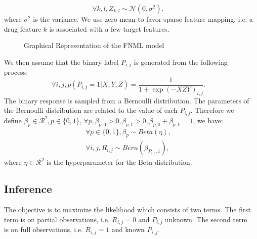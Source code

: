 \documentclass[journal]{IEEEtran}
\begin{document}
\begin{equation}\label{equ:z}
\forall k,l, Z_{k,l}\sim \mathcal{N}(0,\sigma^2),
\end{equation}
where $\sigma^2$ is the variance. We use zero mean to favor sparse feature mapping, i.e. a drug feature $k$ is associated with a few target features.

\begin{figure}
  \centering
{}

\caption{Graphical Representation of the FNML model}\label{fig:model}

\end{figure}

We then assume that the binary label $P_{i,j}$ is generated from the following process:
\begin{equation}\label{equ:p}
\forall i,j, p(P_{i,j}=1|X,Y,Z)=\frac{1}{1+\exp{(-XZY)}_{i,j}}.
\end{equation}
The binary response is sampled from a Bernoulli distribution. The parameters of the Bernoulli distribution are related to the value of each $P_{i,j}$. Therefore we define $\beta_p\in\mathcal{R}^{2},p\in \{0,1\}$, $\forall p, \beta_{p,0}>0,\beta_{p,1}>0,\beta_{p,0}+\beta_{p,1}=1$, we have:
\begin{eqnarray}\label{equ:q}
\forall p\in \{0,1\}, \beta_p \sim Beta(\eta),\\
\forall i,j, R_{i,j} \sim Bern (\beta_{P_{i,j},1}),
\end{eqnarray}
where $\eta\in\mathcal{R}^{2}$ is the hyperparameter for the Beta distribution.

\subsection{Inference}\label{sec:inference}
The objective is to maximize the likelihood which consists of two terms. The first term is on partial observations, i.e. $R_{i,j}=0$ and $P_{i,j}$ unknown. The second term is on full observations, i.e. $R_{i,j}=1$ and known $P_{i,j}$.
\end{document}

